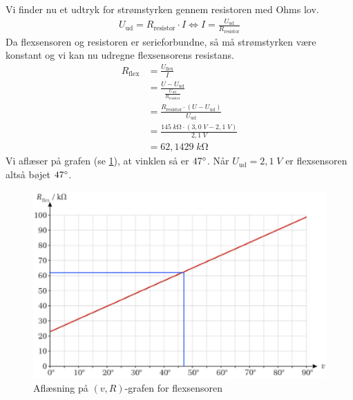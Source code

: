 \documentclass{report}
\begin{document}
Vi finder nu et udtryk for strømstyrken gennem resistoren med Ohms lov.
\begin{equation*}
\begin{split}
  U _{\text{ud} }=R _{\text{resistor} } \cdot I\iff I=\frac{U _{\text{ud} }}{R _{\text{resistor} }}
\end{split}
\end{equation*}
Da flexsensoren og resistoren er serieforbundne, så må strømstyrken være konstant og vi kan nu udregne flexsensorens resistans.
\begin{equation*}
\begin{split}
  R _{\text{flex} }&=\frac{U _{\text{flex}}}{I}\\
  &=\frac{U-U _{\text{ud} }}{\frac{U _{\text{ud} }}{R _{\text{resistor} }}}\\
  &=\frac{R _{\text{resistor} }\cdot \left(U-U _{\text{ud} }\right) }{U _{\text{ud} }}\\
  &=\frac{145  \;\unit{k\ohm} \cdot \left(3,0 \;\unit{V} -2,1 \;\unit{V} \right) }{2,1 \;\unit{V} }\\
  &=62,1429 \;\unit{k\ohm} 
\end{split}
\end{equation*}
Vi aflæser på grafen (se \cref{fig:vR}), at vinklen så er $47 \degree $.
Når $U _{\text{ud} }=2,1 \;\unit{V} $ er flexsensoren altså bøjet $47 \degree $. 
\begin{figure}[H]
\begin{center}
  \includegraphics[width=\textwidth]{vR.png}
\end{center}
  \caption{Aflæsning på $(v,R)$-grafen for flexsensoren}
\label{fig:vR}
\end{figure}
\end{document}

